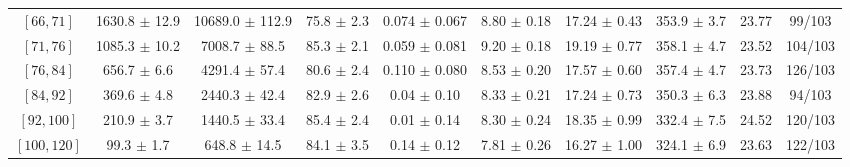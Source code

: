 \begin{tabular}{c||c|c|c|c|c|c|c||c|c}
$[66, 71]$ & 1630.8 $\pm$ 12.9 & 10689.0 $\pm$ 112.9 & 75.8 $\pm$ 2.3 & 0.074 $\pm$ 0.067 & 8.80 $\pm$ 0.18 & 17.24 $\pm$ 0.43 & 353.9 $\pm$ 3.7 & 23.77 & 99/103\\
$[71, 76]$ & 1085.3 $\pm$ 10.2 & 7008.7 $\pm$ 88.5 & 85.3 $\pm$ 2.1 & 0.059 $\pm$ 0.081 & 9.20 $\pm$ 0.18 & 19.19 $\pm$ 0.77 & 358.1 $\pm$ 4.7 & 23.52 & 104/103\\
$[76, 84]$ & 656.7 $\pm$ 6.6 & 4291.4 $\pm$ 57.4 & 80.6 $\pm$ 2.4 & 0.110 $\pm$ 0.080 & 8.53 $\pm$ 0.20 & 17.57 $\pm$ 0.60 & 357.4 $\pm$ 4.7 & 23.73 & 126/103\\
$[84, 92]$ & 369.6 $\pm$ 4.8 & 2440.3 $\pm$ 42.4 & 82.9 $\pm$ 2.6 & 0.04 $\pm$ 0.10 & 8.33 $\pm$ 0.21 & 17.24 $\pm$ 0.73 & 350.3 $\pm$ 6.3 & 23.88 & 94/103\\
$[92, 100]$ & 210.9 $\pm$ 3.7 & 1440.5 $\pm$ 33.4 & 85.4 $\pm$ 2.4 & 0.01 $\pm$ 0.14 & 8.30 $\pm$ 0.24 & 18.35 $\pm$ 0.99 & 332.4 $\pm$ 7.5 & 24.52 & 120/103\\
$[100, 120]$ & 99.3 $\pm$ 1.7 & 648.8 $\pm$ 14.5 & 84.1 $\pm$ 3.5 & 0.14 $\pm$ 0.12 & 7.81 $\pm$ 0.26 & 16.27 $\pm$ 1.00 & 324.1 $\pm$ 6.9 & 23.63 & 122/103\\
\end{tabular}
